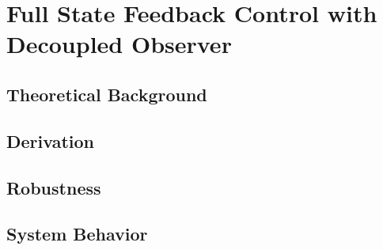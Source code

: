 \section{Full State Feedback Control with Decoupled Observer}

\subsection{Theoretical Background}
\subsection{Derivation}
\subsection{Robustness}
\subsection{System Behavior}

